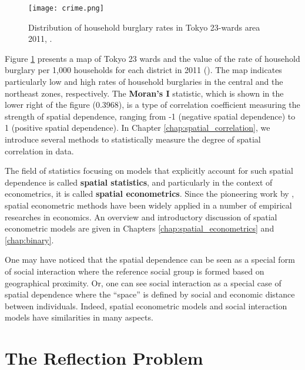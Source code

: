 \documentclass[11pt, A4paper, openany, uplatex]{book}
\begin{document}
\begin{figure}[h!]
	\begin{center}
		\texttt{[image: crime.png]}
		\caption{Distribution of household burglary rates in Tokyo 23-wards area 2011, \cite{hoshino2018semiparametric}.}
		\label{fig:crime}
	\end{center}
\end{figure}

Figure \ref{fig:crime} presents a map of Tokyo 23 wards and the value of the rate of household burglary per 1,000 households for each district in 2011 (\cite{hoshino2018semiparametric}).
The map indicates particularly low and high rates of household burglaries in the central and the northeast zones, respectively.
The \textbf{Moran's I} statistic, which is shown in the lower right of the figure (0.3968), is a type of correlation coefficient measuring the strength of spatial dependence, ranging from -1 (negative spatial dependence) to 1 (positive spatial dependence).
In Chapter \ref{chap:spatial_correlation}, we introduce several methods to statistically measure the degree of spatial correlation in data.

The field of statistics focusing on models that explicitly account for such spatial dependence is called \textbf{spatial statistics}, and particularly in the context of econometrics, it is called \textbf{spatial econometrics}.
Since the pioneering work by \cite{anselin1988spatial}, spatial econometric methods have been widely applied in a number of empirical researches in economics.
An overview and introductory discussion of spatial econometric models are given in Chapters \ref{chap:spatial_econometrics} and \ref{chap:binary}.

One may have noticed that the spatial dependence can be seen as a special form of social interaction where the reference social group is formed based on geographical proximity.
Or, one can see social interaction as a special case of spatial dependence where the ``space'' is defined by social and economic distance between individuals.
Indeed, spatial econometric models and social interaction models have similarities in many aspects.


\chapter{The Reflection Problem}\label{chap:reflection}
\end{document}
